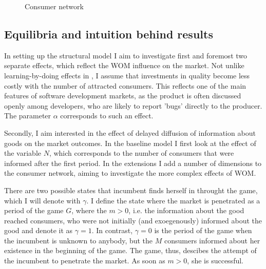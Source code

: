\documentclass{article}
\numberwithin{figure}{section}
\numberwithin{table}{section}
\theoremstyle{indented}
\numberwithin{equation}{section} %
\begin{document}
\begin{figure}
\centering
{}
\caption{Consumer network}
\label{network}
\end{figure}

\subsection{Equilibria and intuition behind results} \label{results}

In setting up the structural model I aim to investigate first and foremost two separate effects, which reflect the WOM influence on the market. Not unlike learning-by-doing effects in \citet{Tirole}, I assume that investments in quality become less costly with the number of attracted consumers. This reflects one of the main features of software development markets, as the product is often discussed openly among developers, who are likely to report 'bugs' directly to the producer. The parameter $\alpha$ corresponds to such an effect. 
 
Secondly, I aim interested in the effect of delayed diffusion of information about goods on the market outcomes. In the baseline model I first look at the effect of the variable $N$, which corresponds to the number of consumers that were informed after the first period. In the extensions I add a number of dimensions to the consumer network, aiming to investigate the more complex effects of WOM. 

There are two possible states that incumbent finds herself in throught the game, which I will denote with $\gamma$. I define the state where the market is penetrated as a period of the game $G$, where the $m>0$, i.e. the information about the good reached consumers, who were not initially (and exoegenously) informed about the good and denote it as $\gamma=1$. In contrast, $\gamma=0$ is the period of the game when the incumbent is unknown to anybody, but the $M$ consumers informed about her existence in the beginning of the game. The game, thus, descibes the attempt of the incumbent to penetrate the market. As soon as $m>0$, she is successful. 
\end{document}
